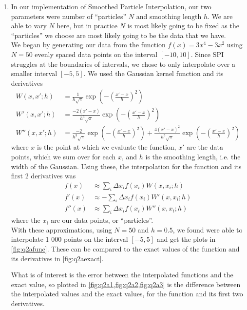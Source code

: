 \documentclass[11pt]{article}
\begin{document}
\begin{enumerate}
    \item In our implementation of Smoothed Particle Interpolation, our two parameters were number of ``particles'' $N$ and smoothing length $h$. We are able to vary $N$ here, but in practice $N$ is most likely going to be fixed as the ``particles'' we choose are most likely going to be the data that we have. \\
    We began by generating our data from the function $f(x)=3x^4-3x^2$ using $N=50$ evenly spaced data points on the interval $[-10,10]$. Since SPI struggles at the boundaries of intervals, we chose to only interpolate over a smaller interval $[-5,5]$. We used the Gaussian kernel function and its derivatives
    \begin{align}
        W(x,x';h) &= \frac{1}{h\sqrt{\pi}}\exp\left(-\left(\frac{x'-x}{h}\right)^2\right) \label{eqn:GaussianKernel}\\
        W'(x,x';h) &= \frac{-2(x'-x)}{h^3\sqrt{\pi}}\exp\left(-\left(\frac{x'-x}{h}\right)^2\right) \label{eqn:GaussianKernelPrime}\\
        W''(x,x';h) &= \frac{-2}{h^3\sqrt{\pi}}\exp\left(-\left(\frac{x'-x}{h}\right)^2\right) + \frac{4(x'-x)^2}{h^5\sqrt{\pi}}\exp\left(-\left(\frac{x'-x}{h}\right)^2\right) \label{eqn:GaussianKernelPrimePrime}
    \end{align}
    where $x$ is the point at which we evaluate the function, $x'$ are the data points, which we sum over for each $x$, and $h$ is the smoothing length, i.e. the width of the Gaussian. Using these, the interpolation for the function and its first 2 derivatives was 
    \begin{align}
        f(x)&\approx \sum_i \Delta x_i f(x_i) W(x,x_i;h) \label{eqn:SPI}\\
        f'(x)&\approx -\sum_i \Delta x_i f(x_i) W'(x,x_i;h) \label{eqn:SPIPrime}\\
        f''(x)&\approx \sum_i \Delta x_i f(x_i) W''(x,x_i;h) \label{eqn:SPIPrimePrime}
    \end{align}
    where the $x_i$ are our data points, or ``particles''.\\
    With these approximations, using $N=50$ and $h=0.5$, we found were able to interpolate 1 000 points on the interval $[-5,5]$ and get the plots in \cref{fig:q2afunc}. These can be compared to the exact values of the function and its derivatives in \cref{fig:q2aexact}.
    
    What is of interest is the error between the interpolated functions and the exact value, so plotted in \cref{fig:q2a1,fig:q2a2,fig:q2a3} is the difference between the interpolated values and the exact values, for the function and its first two derivatives.
    

\end{enumerate}
\end{document}
